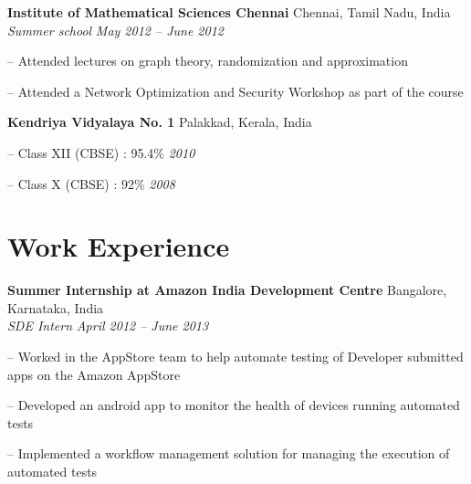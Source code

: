 \documentclass[margin,line]{resume}
\begin{document}
\begin{resume}
    \vspace{2mm}
    
    \textbf{Institute of Mathematical Sciences Chennai} \hfill Chennai, Tamil Nadu, India
    \\
    \textit{Summer school} \hfill \textit{ May 2012 -- June 2012}
    
    \begin{compactitem}
        \item[--] Attended lectures on graph theory, randomization and approximation 
        \item[--] Attended a Network Optimization and Security Workshop as part of the course
    \end{compactitem}
    
    \vspace{2mm}
    
    \textbf{Kendriya Vidyalaya No. 1} \hfill Palakkad, Kerala, India 
    \vspace{+0.5mm}
    \begin{compactitem}
        \item[--] Class XII (CBSE) : 95.4\%    \hfill    \textit{2010}
        \item[--] Class X (CBSE) : 92\%        \hfill    \textit{2008}
    \end{compactitem}
    
     \vspace{2mm}%
         
    \section{\mysidestyle Work Experience } 
	 \textbf{Summer Internship at Amazon India Development Centre} \hfill Bangalore, Karnataka, India
	 \\
     \textit{SDE Intern} \hfill \textit{April 2012 -- June 2013}
    
    \begin{compactitem}
        \item[--] Worked in the AppStore team to help automate testing of Developer submitted apps on the Amazon AppStore
        \item[--] Developed an android app to monitor the health of devices running automated tests
        \item[--] Implemented a workflow management solution for managing the execution of automated tests
    \end{compactitem}
    

\end{resume}
\end{document}
